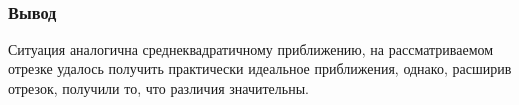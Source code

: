 \documentclass[11pt]{article}
\begin{document}
    \begin{center}
    \end{center}
    { \hspace*{\fill} \\}
    
    \subsubsection*{Вывод}\label{ux432ux44bux432ux43eux434}

Ситуация аналогична среднеквадратичному приближению, на рассматриваемом
отрезке удалось получить практически идеальное приближения, однако,
расширив отрезок, получили то, что различия значительны.


    
    
    
\end{document}
